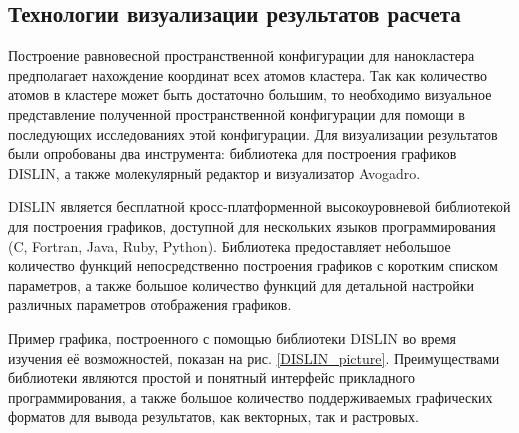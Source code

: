 \subsection{Технологии визуализации результатов расчета}
\label{sec:1d}

Построение равновесной пространственной конфигурации для нанокластера
предполагает нахождение координат всех атомов кластера. Так как количество
атомов в кластере может быть достаточно большим, то необходимо визуальное
представление полученной пространственной конфигурации для помощи в последующих
исследованиях этой конфигурации. Для визуализации результатов были опробованы
два инструмента: библиотека для построения графиков DISLIN, а также
молекулярный редактор и визуализатор Avogadro.

DISLIN является бесплатной кросс-платформенной высокоуровневой библиотекой для
построения графиков, доступной для нескольких языков программирования (C,
Fortran, Java, Ruby, Python).  Библиотека предоставляет небольшое количество
функций непосредственно построения графиков с коротким списком параметров, а
также большое количество функций для детальной настройки различных параметров
отображения графиков.

Пример графика, построенного с помощью библиотеки DISLIN во время изучения её 
возможностей, показан на рис. \ref{DISLIN_picture}. Преимуществами библиотеки
являются простой и понятный интерфейс прикладного программирования, а также
большое количество поддерживаемых графических форматов для вывода результатов,
как векторных, так и растровых.

